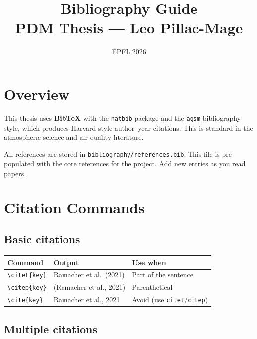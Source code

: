 \documentclass[11pt, a4paper]{article}
\title{\textbf{Bibliography Guide}\\{\large PDM Thesis --- Leo Pillac-Mage}}
\date{EPFL 2026}
\author{}
\begin{document}
\maketitle
\tableofcontents
\newpage

\section{Overview}

This thesis uses \textbf{BibTeX} with the \texttt{natbib} package and the
\texttt{agsm} bibliography style, which produces Harvard-style author--year
citations. This is standard in the atmospheric science and air quality
literature.

All references are stored in \texttt{bibliography/references.bib}. This file is
pre-populated with the core references for the project. Add new entries as you
read papers.

\section{Citation Commands}

\subsection{Basic citations}

\begin{tabular}{lll}
  \textbf{Command} & \textbf{Output} & \textbf{Use when} \\
  \hline
  \texttt{\textbackslash citet\{key\}} & Ramacher et al.\ (2021) & Part of the sentence \\
  \texttt{\textbackslash citep\{key\}} & (Ramacher et al., 2021) & Parenthetical \\
  \texttt{\textbackslash cite\{key\}} & Ramacher et al., 2021 & Avoid (use \texttt{citet}/\texttt{citep}) \\
\end{tabular}

\subsection{Multiple citations}
\end{document}
